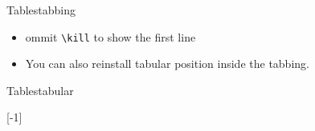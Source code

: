 \begin{frame}[fragile]{Tables\magicPage}{tabbing}\relax
    \cprotect{}
     \pause
     \begin{itemize}
         \item ommit \verb|\kill| to show the first line
         \item You can also reinstall tabular position inside the tabbing.
     \end{itemize}
\end{frame}

\begin{frame}[fragile]{Tables}{tabular}\relax
    \cprotect{}

[-1]
\end{frame}

